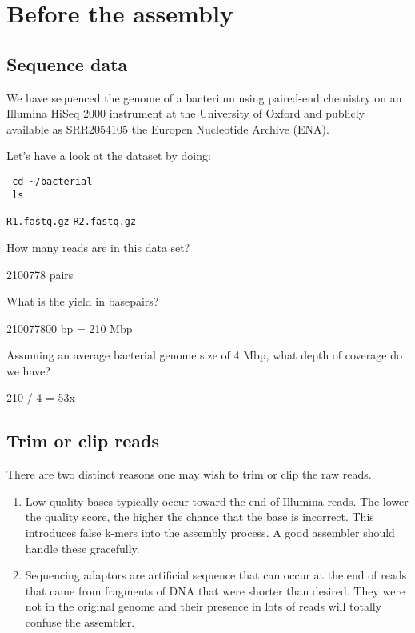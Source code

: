 
\section{Before the assembly}
\subsection{Sequence data}
We have sequenced the genome of a bacterium using paired-end chemistry on
an Illumina HiSeq 2000 instrument at the University of Oxford
and publicly available as SRR2054105 the Europen Nucleotide Archive (ENA).

\begin{steps}
Let's have a look at the dataset by doing:
\begin{lstlisting}
 cd ~/bacterial
 ls
\end{lstlisting}
 \texttt{R1.fastq.gz}
 \texttt{R2.fastq.gz}
\end{steps}


\begin{questions}
How many reads are in this data set? \\
\begin{answer}
2100778 pairs
\end{answer}
What is the yield in basepairs? \\
\begin{answer}
210077800 bp = 210 Mbp
\end{answer}
Assuming an average bacterial genome size of 4 Mbp, what depth of coverage do we have? \\
\begin{answer}
210 / 4 = 53x
\end{answer}
\end{questions}



\subsection{Trim or clip reads}

There are two distinct reasons one may wish to trim or clip the raw reads.
\begin{enumerate}
\item Low quality bases typically occur toward the end of Illumina reads.
The lower the quality score, the higher the chance that the base is incorrect.
This introduces false k-mers into the assembly process. A good assembler
should handle these gracefully.
\item Sequencing adaptors are artificial sequence that can occur at the end of
reads that came from fragments of DNA that were shorter than desired.
They were not in the original genome and their presence in lots of reads
will totally confuse the assembler.
\end{enumerate}


